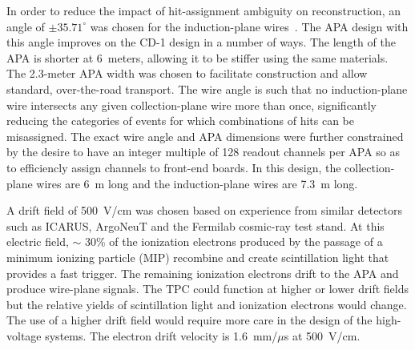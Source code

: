 In order to reduce the impact of hit-assignment ambiguity on
reconstruction, an angle of $\pm35.71^\circ$ was chosen for the
induction-plane wires~\cite{fd_9374,fd_8981,fd_9886}.  The APA
design with this angle improves on the CD-1 design in a number of
ways.  The length of the APA is shorter at 6~meters, allowing it to be
stiffer using the same materials.  The 2.3-meter APA width was chosen
to facilitate construction and allow standard, over-the-road
transport. The wire angle is such that no induction-plane wire
intersects any given collection-plane wire more than once,
significantly reducing the categories of events for which combinations
of hits can be misassigned.  The exact wire angle and APA dimensions
were further constrained by the desire to have an integer multiple of
128 readout channels per APA so as to efficiencly assign channels to
front-end boards.  In this design, the collection-plane wires are 6~m
long and the induction-plane wires are 7.3~m long.


A drift field of 500~V/cm was chosen based on experience from similar
detectors such as ICARUS, ArgoNeuT and the Fermilab cosmic-ray test
stand. At this electric field, $\sim$ 30\% of the ionization electrons
produced by the passage of a minimum ionizing particle (MIP) recombine
and create scintillation light that provides a fast trigger. The
remaining ionization electrons drift to the APA and produce wire-plane
signals. The TPC could function at higher or lower drift fields but
the relative yields of scintillation light and ionization electrons
would change. The use of a higher drift field would require more care
in the design of the high-voltage systems. The electron drift velocity
is 1.6~mm/$\mu$s at 500~V/cm.

